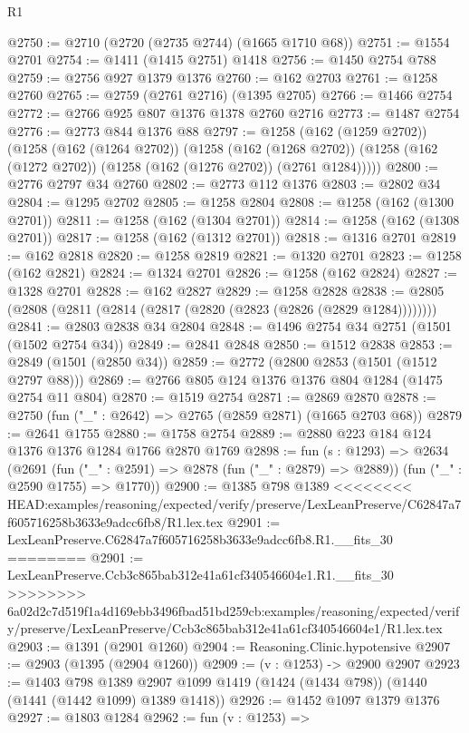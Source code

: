 \begin{lexlean}{R1}
\begin{coremodule}
{{{{{{{{{{{{{{{{{{{{{{{{{{{{{{{{{{{{{{{{{{{{{{{{{{{{{{{{{{{{{{{{{{{{{{{{{{{{{{{{{{{{{{{{{{@2750 := @2710 (@2720 (@2735 @2744) (@1665 @1710 @68))
@2751 := @1554 @2701
@2754 := @1411 (@1415 @2751) @1418
@2756 := @1450 @2754 @788
@2759 := @2756 @927 @1379 @1376
@2760 := @162 @2703
@2761 := @1258 @2760
@2765 := @2759 (@2761 @2716) (@1395 @2705)
@2766 := @1466 @2754
@2772 := @2766 @925 @807 @1376 @1378 @2760 @2716
@2773 := @1487 @2754
@2776 := @2773 @844 @1376 @88
@2797 := @1258
    (@162 (@1259 @2702))
    (@1258
      (@162 (@1264 @2702))
      (@1258
        (@162 (@1268 @2702))
        (@1258 (@162 (@1272 @2702)) (@1258 (@162 (@1276 @2702)) (@2761 @1284)))))
@2800 := @2776 @2797 @34 @2760
@2802 := @2773 @112 @1376
@2803 := @2802 @34
@2804 := @1295 @2702
@2805 := @1258 @2804
@2808 := @1258 (@162 (@1300 @2701))
@2811 := @1258 (@162 (@1304 @2701))
@2814 := @1258 (@162 (@1308 @2701))
@2817 := @1258 (@162 (@1312 @2701))
@2818 := @1316 @2701
@2819 := @162 @2818
@2820 := @1258 @2819
@2821 := @1320 @2701
@2823 := @1258 (@162 @2821)
@2824 := @1324 @2701
@2826 := @1258 (@162 @2824)
@2827 := @1328 @2701
@2828 := @162 @2827
@2829 := @1258 @2828
@2838 := @2805 (@2808 (@2811 (@2814 (@2817 (@2820 (@2823 (@2826 (@2829 @1284))))))))
@2841 := @2803 @2838 @34 @2804
@2848 := @1496 @2754 @34 @2751 (@1501 (@1502 @2754 @34))
@2849 := @2841 @2848
@2850 := @1512 @2838
@2853 := @2849 (@1501 (@2850 @34))
@2859 := @2772 (@2800 @2853 (@1501 (@1512 @2797 @88)))
@2869 := @2766 @805 @124 @1376 @1376 @804 @1284 (@1475 @2754 @11 @804)
@2870 := @1519 @2754
@2871 := @2869 @2870
@2878 := @2750 (fun ("_" : @2642) => @2765 (@2859 @2871) (@1665 @2703 @68))
@2879 := @2641 @1755
@2880 := @1758 @2754
@2889 := @2880 @223 @184 @124 @1376 @1376 @1284 @1766 @2870 @1769
@2898 := fun (s : @1293) =>
  @2634
    (@2691
      (fun ("_" : @2591) => @2878 (fun ("_" : @2879) => @2889))
      (fun ("_" : @2590 @1755) => @1770))
@2900 := @1385 @798 @1389
<<<<<<<< HEAD:examples/reasoning/expected/verify/preserve/LexLeanPreserve/C62847a7f605716258b3633e9adcc6fb8/R1.lex.tex
@2901 := LexLeanPreserve.C62847a7f605716258b3633e9adcc6fb8.R1.__fits_30
========
@2901 := LexLeanPreserve.Ccb3c865bab312e41a61cf340546604e1.R1.__fits_30
>>>>>>>> 6a02d2c7d519f1a4d169ebb3496fbad51bd259cb:examples/reasoning/expected/verify/preserve/LexLeanPreserve/Ccb3c865bab312e41a61cf340546604e1/R1.lex.tex
@2903 := @1391 (@2901 @1260)
@2904 := Reasoning.Clinic.hypotensive
@2907 := @2903 (@1395 (@2904 @1260))
@2909 := (v : @1253) -> @2900 @2907
@2923 := @1403
    @798
    @1389
    @2907
    @1099
    @1419
    (@1424 (@1434 @798))
    (@1440 (@1441 (@1442 @1099) @1389 @1418))
@2926 := @1452 @1097 @1379 @1376
@2927 := @1803 @1284
@2962 := fun (v : @1253) =>
}}}}}}}}}}}}}}}}}}}}}}}}}}}}}}}}}}}}}}}}}}}}}}}}}}}}}}}}}}}}}}}}}}}}}}}}}}}}}}}}}}}}}}}}}}
\end{coremodule}
\end{lexlean}

